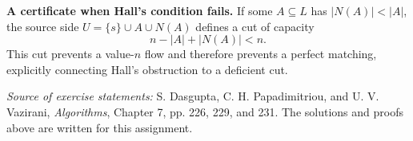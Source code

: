 \documentclass[11pt]{article}
\begin{document}
\textbf{A certificate when Hall's condition fails.}
If some $A\subseteq L$ has $|N(A)|<|A|$, the source side
$U=\{s\}\cup A\cup N(A)$ defines a cut of capacity
\[
 n-|A|+|N(A)|<n.
\]
This cut prevents a value-$n$ flow and therefore prevents a perfect
matching, explicitly connecting Hall's obstruction to a deficient cut.

\vfill
{\footnotesize\textit{Source of exercise statements:}
S. Dasgupta, C. H. Papadimitriou, and U. V. Vazirani,
\textit{Algorithms}, Chapter 7, pp. 226, 229, and 231.
The solutions and proofs above are written for this assignment.}
\end{document}

